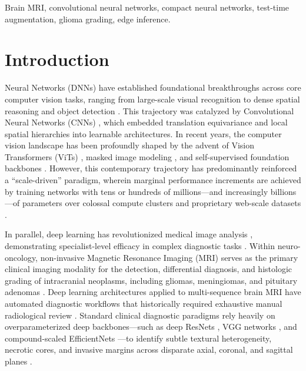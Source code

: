 ﻿\documentclass[journal]{IEEEtran}
\begin{document}
\begin{IEEEkeywords}
Brain MRI, convolutional neural networks, compact neural networks, test-time augmentation, glioma grading, edge inference.
\end{IEEEkeywords}

\IEEEpeerreviewmaketitle

\section{Introduction}
 Neural Networks (DNNs) have established foundational breakthroughs across core computer vision tasks, ranging from large-scale visual recognition \cite{11, 24} to dense spatial reasoning and object detection \cite{14, 53}. This trajectory was catalyzed by Convolutional Neural Networks (CNNs) \cite{23}, which embedded translation equivariance and local spatial hierarchies into learnable architectures. In recent years, the computer vision landscape has been profoundly shaped by the advent of Vision Transformers (ViTs) \cite{9}, masked image modeling \cite{46}, and self-supervised foundation backbones \cite{1}. However, this contemporary trajectory has predominantly reinforced a ``scale-driven'' paradigm, wherein marginal performance increments are achieved by training networks with tens or hundreds of millions---and increasingly billions---of parameters over colossal compute clusters and proprietary web-scale datasets \cite{11, 42}.

In parallel, deep learning has revolutionized medical image analysis \cite{10, 27}, demonstrating specialist-level efficacy in complex diagnostic tasks \cite{10}. Within neuro-oncology, non-invasive Magnetic Resonance Imaging (MRI) serves as the primary clinical imaging modality for the detection, differential diagnosis, and histologic grading of intracranial neoplasms, including gliomas, meningiomas, and pituitary adenomas \cite{2, 34}. Deep learning architectures applied to multi-sequence brain MRI have automated diagnostic workflows that historically required exhaustive manual radiological review \cite{2, 34, 38}. Standard clinical diagnostic paradigms rely heavily on overparameterized deep backbones---such as deep ResNets \cite{14}, VGG networks \cite{39}, and compound-scaled EfficientNets \cite{40}---to identify subtle textural heterogeneity, necrotic cores, and invasive margins across disparate axial, coronal, and sagittal planes \cite{36, 44}.
\end{document}

